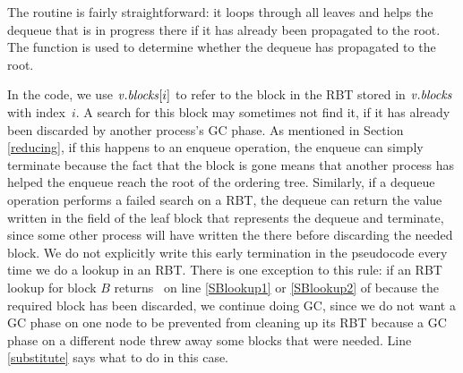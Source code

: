 The  routine is fairly straightforward:  it loops through all leaves and
helps the dequeue that is in progress there if it has already been propagated to the root.
The  function is used to determine whether the dequeue has propagated to the root.

In the code, we use $\mbox{\textnormal{\textit{v}}}.\mbox{\textit{blocks}}[i]$ to refer to the block in the RBT stored in $\mbox{\textnormal{\textit{v}}}.\mbox{\textit{blocks}}$
with index~$i$.
A search for this block may sometimes not find it, if it has already been discarded
by another process's GC phase.
As mentioned in Section \ref{reducing}, if this happens to an enqueue operation,
the enqueue can simply terminate because the fact that the block is gone means that another
process has helped the enqueue reach the root of the ordering tree.
Similarly, if  a dequeue operation performs a failed search on a RBT, the dequeue can return the value 
written in the  field of the 
leaf block that represents the dequeue and terminate, since some other process
will have written the  there before discarding the needed block.
We do not explicitly write this early termination in the pseudocode every time we do a lookup in an RBT.
There is one exception to this rule:  if an RBT lookup for block $B$ returns \nl\
on line \ref{SBlookup1} or \ref{SBlookup2} of
 because the required block has been discarded, 
we continue doing GC, since we do not want a GC phase on one node
to be prevented from cleaning up its RBT because a GC phase on a different node threw away some blocks
that were needed.
Line \ref{substitute} says what to do in this case.
